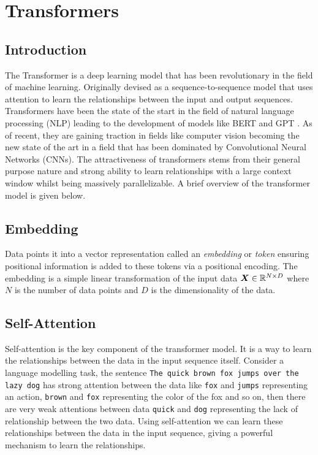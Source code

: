 \documentclass[../../main.tex]{subfiles}
\begin{document}
\section{Transformers}
\subsection{Introduction}

The Transformer \cite{vaswani2017attention} is a deep learning model that has been revolutionary in the field of machine learning. Originally devised as a sequence-to-sequence model that uses attention to learn the relationships between the input and output sequences. Transformers have been the state of the start in the field of natural language processing (NLP) leading to the development of models like BERT \cite{devlin2019bert} and GPT \cite{brown2020language}. As of recent, they are gaining traction in fields like computer vision \cite{dosovitskiy2021image} becoming the new state of the art in a field that has been dominated by Convolutional Neural Networks (CNNs). The attractiveness of transformers stems from their general purpose nature and strong ability to learn relationships with a large context window whilst being massively parallelizable. A brief overview of the transformer model is given below.


\subsection{Embedding}

Data points it into a vector representation called an \emph{embedding} or \emph{token} ensuring positional information is added to these tokens via a positional encoding. The embedding is a simple linear transformation of the input data $\bm{X} \in \mathbb{R}^{N \times D}$ where $N$ is the number of data points and $D$ is the dimensionality of the data. 

\subsection{Self-Attention}

 Self-attention is the key component of the transformer model. It is a way to learn the relationships between the data in the input sequence itself.  Consider a language modelling task, the sentence \texttt{The quick brown fox jumps over the lazy dog} has strong attention between the data like \texttt{fox} and \texttt{jumps} representing an action, \texttt{brown} and \texttt{fox} representing the color of the fox and so on, then there are very weak attentions between data \texttt{quick} and \texttt{dog} representing the lack of relationship between the two data. Using self-attention we can learn these relationships between the data in the input sequence, giving a powerful mechanism to learn the relationships.
\end{document}
